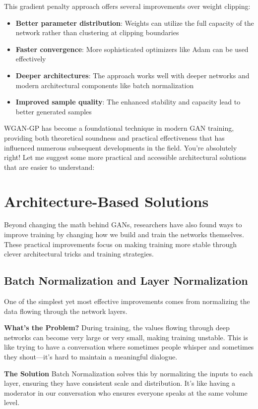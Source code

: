 This gradient penalty approach offers several improvements over weight clipping:
\begin{itemize}
    \item \textbf{Better parameter distribution}: Weights can utilize the full capacity of the network rather than clustering at clipping boundaries
    \item \textbf{Faster convergence}: More sophisticated optimizers like Adam can be used effectively
    \item \textbf{Deeper architectures}: The approach works well with deeper networks and modern architectural components like batch normalization
    \item \textbf{Improved sample quality}: The enhanced stability and capacity lead to better generated samples
\end{itemize}

WGAN-GP has become a foundational technique in modern GAN training, providing both theoretical soundness and practical effectiveness that has influenced numerous subsequent developments in the field.
You're absolutely right! Let me suggest some more practical and accessible architectural solutions that are easier to understand:

\section{Architecture-Based Solutions}

Beyond changing the math behind GANs, researchers have also found ways to improve training by changing how we build and train the networks themselves. These practical improvements focus on making training more stable through clever architectural tricks and training strategies.

\subsection{Batch Normalization and Layer Normalization}

One of the simplest yet most effective improvements comes from normalizing the data flowing through the network layers.

\textbf{What's the Problem?}
During training, the values flowing through deep networks can become very large or very small, making training unstable. This is like trying to have a conversation where sometimes people whisper and sometimes they shout—it's hard to maintain a meaningful dialogue.

\textbf{The Solution}
Batch Normalization \cite{ioffe2015batch} solves this by normalizing the inputs to each layer, ensuring they have consistent scale and distribution. It's like having a moderator in our conversation who ensures everyone speaks at the same volume level.

